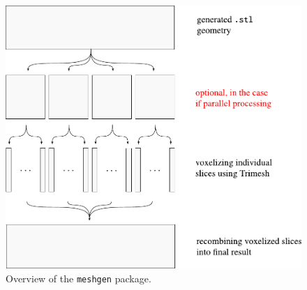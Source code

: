 \begin{figure}[H]
	\centering
	\vspace{6mm}
	\includegraphics[width=.77\textwidth]{figures/voxelizing.pdf}
	\vspace{4mm}
	\caption{Overview of the \texttt{meshgen} package.}
	\label{fig:voxelizing}
\end{figure}